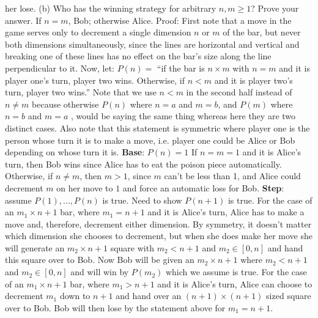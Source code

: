 \documentclass[12pt]{article}
\begin{document}
her lose.
\newline
\newline
(b) Who has the winning strategy for arbitrary $n,m \geq 1$? Prove your answer.
\newline
\newline
If $n = m$, Bob; otherwise Alice.
\newline
\newline
Proof: 
\newline
First note that a move in the game serves only to decrement a single dimension $n $ or $m$ of the bar, but never both dimensions simultaneously, since
the lines are horizontal and vertical and breaking one of these lines has no effect on the bar's size along the line perpendicular to it. Now,
let:
\newline
\newline
$P(n) = $ ``if the bar is $n \times m$ with $n = m$ and it is player one's turn, player two wins. Otherwise, if $n < m$ and it is player two's turn, player two wins.''
\newline
Note that we use $n < m$ in the second half instead of $n \neq m$ because otherwise $P(n)$ where $n = a$ and $m = b$, and $P(m)$ where $n = b$ and $m = a$ , would be saying the same thing whereas here they are two distinct cases. Also note that this statement
is symmetric where player one is the person whose turn it is to make a move, i.e. player one could be Alice or Bob depending on whose turn it is.
\newline
\newline
\textbf{Base}: $P(n) = 1$
\newline
\newline
If $n = m = 1$ and it is Alice's turn, then Bob wins since Alice has to eat the poison piece automatically. 
\newline
\newline
Otherwise, if $n \neq m$, then 
$m > 1$, since $m$ can't be less than 1, and Alice could decrement $m$ on her move to $1$ and force an automatic loss for Bob.
\newline
\newline
\textbf{Step}: assume $P(1), ... , P(n)$ is true. Need to show $P(n+1)$ is true.
\newline
\newline
For the case of an $m_1 \times n+1$ bar, where $m_1 = n+1$ and it is Alice's turn, Alice has to make a move and, therefore, decrement either dimension. By symmetry, it
doesn't matter which dimension she chooses to decrement, but when she does make her move she will generate an  $m_2 \times n+1$ square with $m_2 < n+1$ and $m_2 \in [0,n]$ and
hand this square over to Bob. Now Bob will be given an $m_2 \times n+1$ where $m_2 < n+1$ and $m_2 \in [0,n]$ and will win by $P(m_2)$ which we assume is true.
\newline
\newline
For the case of an $m_1 \times n+1$ bar, where $m_1 > n+1$ and it is Alice's turn, Alice can choose to decrement $m_1$ down to $n+1$ and hand over an $(n+1) \times (n+1)$ sized square over to 
Bob. Bob will then lose by the statement above for $m_1 = n+1$.
\end{document}
